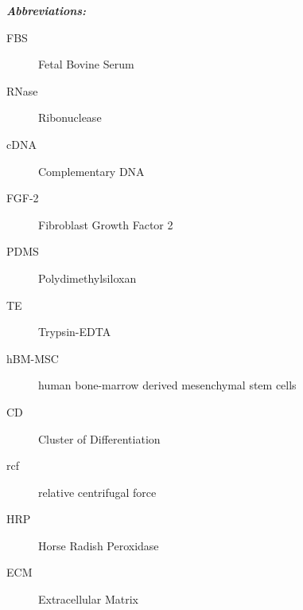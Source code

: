 \textit{\textbf{Abbreviations:}}
\begin{description}
\item[FBS] Fetal Bovine Serum
\item[RNase] Ribonuclease
\item[cDNA] Complementary DNA
\item[FGF-2] Fibroblast Growth Factor 2
\item[PDMS] Polydimethylsiloxan
\item[TE] Trypsin-EDTA
\item[hBM-MSC] human bone-marrow derived mesenchymal stem cells 
\item[CD] Cluster of Differentiation
\item[rcf] relative centrifugal force
\item[HRP] Horse Radish Peroxidase
\item[ECM] Extracellular Matrix
\end{description}